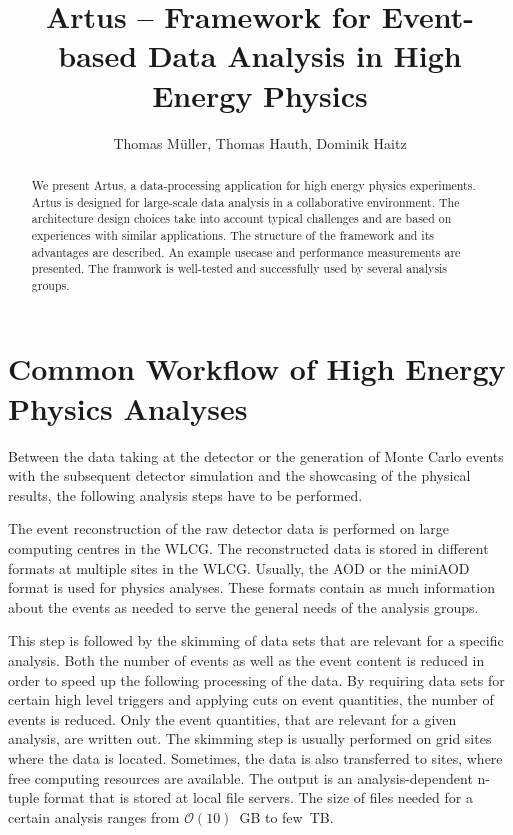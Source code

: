 \documentclass[3p]{elsarticle}
\begin{document}
\begin{frontmatter}
\title{Artus -- Framework for Event-based Data Analysis in High Energy Physics}

\author[kit]{Thomas M\"uller, Thomas Hauth, Dominik Haitz}
\address[kit]{Karlsruhe Institute of Technology, Wolfgang-Gaede-Stra\ss{}e 1, D-76131 Karlsruhe}

\begin{abstract}
We present Artus, a data-processing application for high energy physics experiments. Artus is designed for large-scale data analysis in a collaborative environment.
The architecture design choices take into account typical challenges and are based on experiences with similar applications.
The structure of the framework and its advantages are described.
An example usecase and performance measurements are presented.
The framwork is well-tested and successfully used by several analysis groups.

\end{abstract}

\end{frontmatter}


\section{Common Workflow of High Energy Physics Analyses \label{section_artus_analysis_workflow}}

Between the data taking at the detector or the generation of Monte Carlo events with the subsequent detector simulation and the showcasing of the physical results, the following analysis steps have to be performed.

The event reconstruction of the raw detector data is performed on large computing centres in the WLCG. The reconstructed data is stored in different formats at multiple sites in the WLCG. Usually, the AOD or the miniAOD format is used for physics analyses. These formats contain as much information about the events as needed to serve the general needs of the analysis groups.

This step is followed by the skimming of data sets that are relevant for a specific analysis. Both the number of events as well as the event content is reduced in order to speed up the following processing of the data. By requiring data sets for certain high level triggers and applying cuts on event quantities, the number of events is reduced. Only the event quantities, that are relevant for a given analysis, are written out. The skimming step is usually performed on grid sites where the data is located. Sometimes, the data is also transferred to sites, where free computing resources are available. The output is an analysis-dependent n-tuple format that is stored at local file servers. The size of files needed for a certain analysis ranges from $\mathcal O(10)$~GB to few~TB.
\end{document}
